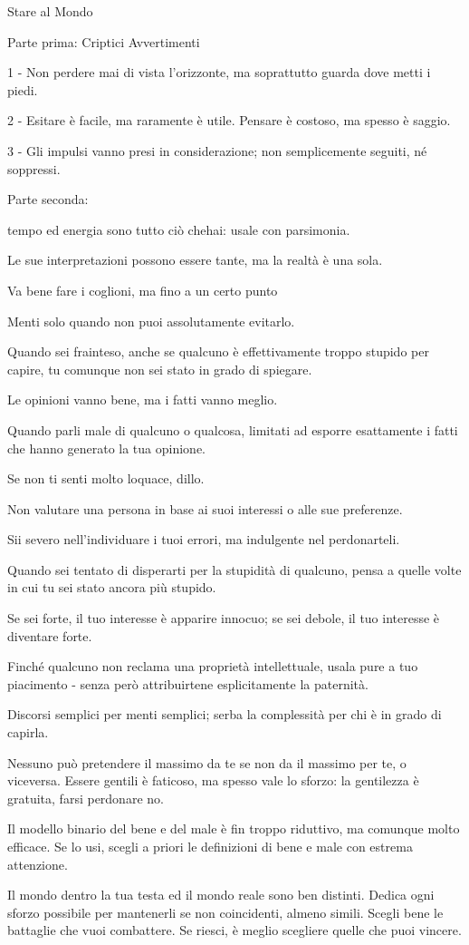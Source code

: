 Stare al Mondo

Parte prima: Criptici Avvertimenti

1 - Non perdere mai di vista l’orizzonte, ma soprattutto guarda dove metti i piedi.

2 - Esitare è facile, ma raramente è utile. Pensare è costoso, ma spesso è saggio.

3 - Gli impulsi vanno presi in considerazione; non semplicemente seguiti, né soppressi.

Parte seconda: 

tempo ed energia sono tutto ciò chehai: usale con parsimonia.

Le sue interpretazioni possono essere tante, ma la realtà è una sola.

Va bene fare i coglioni, ma fino a un certo punto

Menti solo quando non puoi assolutamente evitarlo.

Quando sei frainteso, anche se qualcuno è effettivamente troppo stupido per capire, tu comunque non sei stato in grado di spiegare.

Le opinioni vanno bene, ma i fatti vanno meglio.



Quando parli male di qualcuno o qualcosa, limitati ad esporre esattamente i fatti che hanno generato la tua opinione.

Se non ti senti molto loquace, dillo.

Non valutare una persona in base ai suoi interessi o alle sue preferenze.

Sii severo nell’individuare i tuoi errori, ma indulgente nel perdonarteli.

Quando sei tentato di disperarti per la stupidità di qualcuno, pensa a quelle volte in cui tu sei stato ancora più stupido.

Se sei forte, il tuo interesse è apparire innocuo; se sei debole, il tuo interesse è diventare forte.



Finché qualcuno non reclama una proprietà intellettuale, usala pure a tuo piacimento - senza però attribuirtene esplicitamente la paternità.

Discorsi semplici per menti semplici; serba la complessità per chi è in grado di capirla.

Nessuno può pretendere il massimo da te se non da il massimo per te, o viceversa.
Essere gentili è faticoso, ma spesso vale lo sforzo: la gentilezza è gratuita, farsi perdonare no.


Il modello binario del bene e del male è fin troppo riduttivo, ma comunque molto efficace. Se lo usi, scegli a priori le definizioni di bene e male con estrema attenzione.

Il mondo dentro la tua testa ed il mondo reale sono ben distinti. Dedica ogni sforzo possibile per mantenerli se non coincidenti, almeno simili.
Scegli bene le battaglie che vuoi combattere. Se riesci, è meglio scegliere quelle che puoi vincere.
​